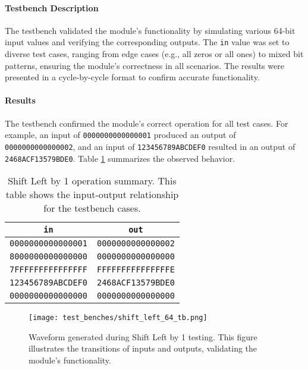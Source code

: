 \documentclass[12pt]{article}
\begin{document}
\paragraph{Testbench Description}
The testbench validated the module's functionality by simulating various 64-bit input values and verifying the corresponding outputs. The \texttt{in} value was set to diverse test cases, ranging from edge cases (e.g., all zeros or all ones) to mixed bit patterns, ensuring the module's correctness in all scenarios. The results were presented in a cycle-by-cycle format to confirm accurate functionality.

\paragraph{Results}
The testbench confirmed the module's correct operation for all test cases. For example, an input of \texttt{0000000000000001} produced an output of \texttt{0000000000000002}, and an input of \texttt{123456789ABCDEF0} resulted in an output of \texttt{2468ACF13579BDE0}. Table \ref{tab:shift_left_results} summarizes the observed behavior.

\begin{table}[ht!]
    \centering
    \renewcommand{\arraystretch}{1.1}
    \setlength{\tabcolsep}{3pt}
    \begin{tabular}{|c|c|}
        \hline
        \textbf{\texttt{in}} & \textbf{\texttt{out}} \\
        \hline
        \texttt{0000000000000001} & \texttt{0000000000000002} \\
        \texttt{8000000000000000} & \texttt{0000000000000000} \\
        \texttt{7FFFFFFFFFFFFFFF} & \texttt{FFFFFFFFFFFFFFFE} \\
        \texttt{123456789ABCDEF0} & \texttt{2468ACF13579BDE0} \\
        \texttt{0000000000000000} & \texttt{0000000000000000} \\
        \hline
    \end{tabular}
    \caption{Shift Left by 1 operation summary. This table shows the input-output relationship for the testbench cases.}
    \label{tab:shift_left_results}
\end{table}

\begin{figure}[ht!]
    \centering
    \texttt{[image: test\_benches/shift\_left\_64\_tb.png]}
    \caption{Waveform generated during Shift Left by 1 testing. This figure illustrates the transitions of inputs and outputs, validating the module's functionality.}
    \label{fig:shift_left_waveform}
\end{figure}
\end{document}
